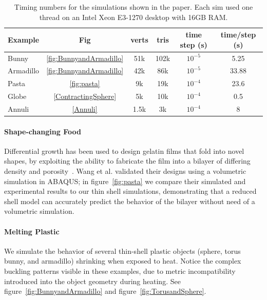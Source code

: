 \documentclass[timestamp,acmtog]{acmart}
\begin{document}
\begin{table}[htb]
\begin{tabular}{lc|cc|cc}
Example & Fig & verts & tris & time step (s) & time/step (s) \\
\hline
Bunny & \ref{fig:BunnyandArmadillo} & 51k & 102k & $10^{-5}$ & 5.25  \\
Armadillo & \ref{fig:BunnyandArmadillo} & 42k & 86k &  $10^{-5}$ & 33.88 \\
Pasta & \ref{fig:pasta} & 9k & 19k & $10^{-4}$ &  23.6 \\
Globe & \ref{ContractingSphere} & 5k & 10k & $10^{-4}$ & 0.5 \\
Annuli  & \ref{Annuli} & 1.5k & 3k & $10^{-4}$ & 8 
\end{tabular}
\caption{Timing numbers for the simulations shown in the paper. Each sim used one thread on an Intel Xeon E3-1270 desktop with 16GB RAM.}
\label{tab:timing}
\end{table}


\paragraph{Shape-changing Food} Differential growth has been used to design gelatin films that fold into novel shapes, by exploiting the ability to fabricate the film into a bilayer of differing density and porosity~\cite{Wang2017}. Wang et al. validated their designs using a volumetric simulation in ABAQUS; in figure~\ref{fig:pasta} we compare their simulated and experimental results to our thin shell simulations, demonstrating that a reduced shell model can accurately predict the behavior of the bilayer without need of a volumetric simulation.

\paragraph{Melting Plastic} We simulate the behavior of several thin-shell plastic objects (sphere, torus bunny, and armadillo) shrinking when exposed to heat. Notice the complex buckling patterns visible in these examples, due to metric incompatibility introduced into the object geometry during heating. See figure~\ref{fig:BunnyandArmadillo} and figure~\ref{fig:TorusandSphere}.
\end{document}
